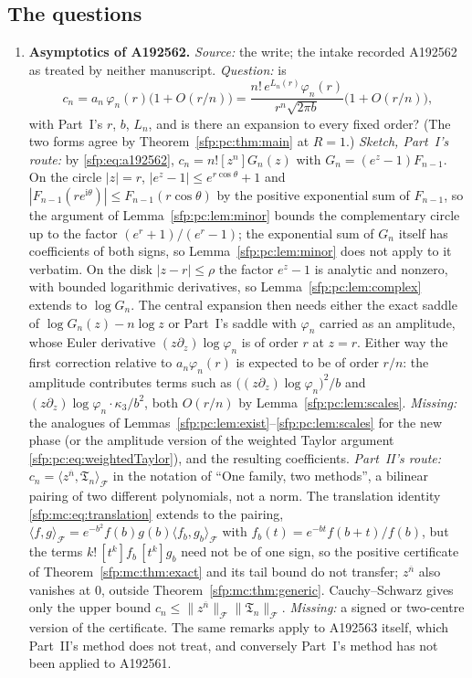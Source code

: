 \documentclass[11pt,letterpaper]{article}
\numberwithin{equation}{section}
\theoremstyle{definition}\newtheorem{definition}[theorem]{Definition}
\theoremstyle{remark}\newtheorem{remark}[theorem]{Remark}
\newcommand{\ii}{\mathrm i}
\begin{document}
\subsection{The questions}
\begin{enumerate}
\item\label{sfp:q:a192562} \textbf{Asymptotics of A192562.} \emph{Source:} the write; the intake recorded A192562 as treated by neither manuscript. \emph{Question:} is
\[
 c_n=a_n\,\varphi_n(r)\bigl(1+O(r/n)\bigr)
    =\frac{n!\,e^{L_n(r)}\varphi_n(r)}{r^n\sqrt{2\pi b}}\bigl(1+O(r/n)\bigr),
\]
with Part~I's $r$, $b$, $L_n$, and is there an expansion to every fixed order? (The two forms agree by Theorem~\ref{sfp:pc:thm:main} at $R=1$.) \emph{Sketch, Part~I's route:} by \eqref{sfp:eq:a192562}, $c_n=n![z^n]G_n(z)$ with $G_n=(e^z-1)F_{n-1}$. On the circle $|z|=r$, $|e^z-1|\le e^{r\cos\theta}+1$ and $|F_{n-1}(re^{\ii\theta})|\le F_{n-1}(r\cos\theta)$ by the positive exponential sum of $F_{n-1}$, so the argument of Lemma~\ref{sfp:pc:lem:minor} bounds the complementary circle up to the factor $(e^{r}+1)/(e^{r}-1)$; the exponential sum of $G_n$ itself has coefficients of both signs, so Lemma~\ref{sfp:pc:lem:minor} does not apply to it verbatim. On the disk $|z-r|\le\rho$ the factor $e^z-1$ is analytic and nonzero, with bounded logarithmic derivatives, so Lemma~\ref{sfp:pc:lem:complex} extends to $\log G_n$. The central expansion then needs either the exact saddle of $\log G_n(z)-n\log z$ or Part~I's saddle with $\varphi_n$ carried as an amplitude, whose Euler derivative $(z\partial_z)\log\varphi_n$ is of order $r$ at $z=r$. Either way the first correction relative to $a_n\varphi_n(r)$ is expected to be of order $r/n$: the amplitude contributes terms such as $\bigl((z\partial_z)\log\varphi_n\bigr)^2/b$ and $(z\partial_z)\log\varphi_n\cdot\kappa_3/b^2$, both $O(r/n)$ by Lemma~\ref{sfp:pc:lem:scales}. \emph{Missing:} the analogues of Lemmas~\ref{sfp:pc:lem:exist}--\ref{sfp:pc:lem:scales} for the new phase (or the amplitude version of the weighted Taylor argument \eqref{sfp:pc:eq:weightedTaylor}), and the resulting coefficients. \emph{Part~II's route:} $c_n=\langle z^{\overline n},\mathfrak T_n\rangle_{\mathcal F}$ in the notation of ``One family, two methods'', a bilinear pairing of two different polynomials, not a norm. The translation identity \eqref{sfp:mc:eq:translation} extends to the pairing, $\langle f,g\rangle_{\mathcal F}=e^{-b^2}f(b)g(b)\langle f_b,g_b\rangle_{\mathcal F}$ with $f_b(t)=e^{-bt}f(b+t)/f(b)$, but the terms $k!\,[t^k]f_b\,[t^k]g_b$ need not be of one sign, so the positive certificate of Theorem~\ref{sfp:mc:thm:exact} and its tail bound do not transfer; $z^{\overline n}$ also vanishes at $0$, outside Theorem~\ref{sfp:mc:thm:generic}. Cauchy--Schwarz gives only the upper bound $c_n\le\|z^{\overline n}\|_{\mathcal F}\|\mathfrak T_n\|_{\mathcal F}$. \emph{Missing:} a signed or two-centre version of the certificate. The same remarks apply to A192563 itself, which Part~II's method does not treat, and conversely Part~I's method has not been applied to A192561.

\end{enumerate}
\end{document}
